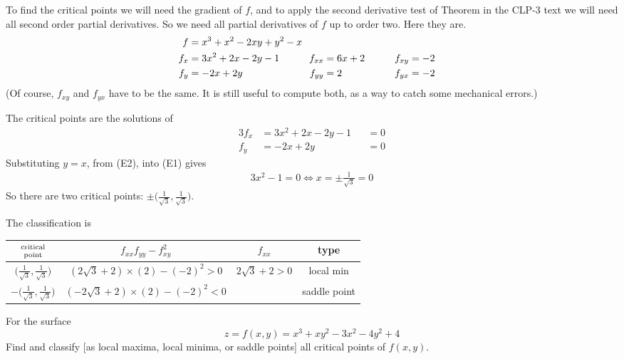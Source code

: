 \begin{solution}
To find the critical points we will need the
gradient of $f$, and to apply the second derivative test of 
Theorem  in the CLP-3 text 
we will need all 
second order partial derivatives. So we need all partial derivatives of
$f$ up to order two.
Here they are.
\begin{alignat*}{3}
f&=x^3 + x^2 - 2xy + y^2 - x \hidewidth\\
f_x&=3x^2+2x-2y-1 \qquad   & f_{xx}&=6x+2 \qquad & f_{xy}&= -2\\
f_y&=-2x+2y  & f_{yy}&=2\qquad & f_{yx}&= -2
\end{alignat*}
(Of course, $f_{xy}$ and $f_{yx}$ have to be the same. It is still
useful to compute both, as a way to catch some mechanical errors.)

The critical points are the solutions of
\begin{alignat*}{3}
f_x&=3x^2+2x-2y-1&&=0  \tag{E1} \\
f_y&=-2x+2y &&= 0  \tag{E2}
\end{alignat*}
Substituting $y=x$, from (E2), into (E1) gives
\begin{align*}
3x^2-1=0
\iff x=\pm\frac{1}{\sqrt{3}}=0
\end{align*}
So there are two critical points: $\pm\big(\frac{1}{\sqrt{3}},\frac{1}{\sqrt{3}}\big)$.


The classification is
\begin{center}
\renewcommand{\arraystretch}{1.3}
     \begin{tabular}{|c|c|c|c|}
     \hline
    $\Atop{\text{critical}}{\text{point}}$  & $f_{xx}f_{yy}-f_{xy}^2$ & 
                                                          $f_{xx}$ & type \\    
    \hline
     $\big(\frac{1}{\sqrt{3}},\frac{1}{\sqrt{3}}\big)$  & 
           $(2\sqrt{3}+2)\times (2)-(-2)^2> 0$ &  $2\sqrt{3}+2>0$  & local min  \\ \hline
     $-\big(\frac{1}{\sqrt{3}},\frac{1}{\sqrt{3}}\big)$  & 
       $(-2\sqrt{3}+2)\times (2)-(-2)^2<0$ &  & saddle point \\  \hline
     \end{tabular}
\renewcommand{\arraystretch}{1.0}
\end{center}
\end{solution}

\begin{question}[M200 2009D] %
For the surface
\begin{equation*}
z = f (x, y) = x^3 + xy^2 - 3x^2 - 4y^2 + 4
\end{equation*}
Find and classify [as local maxima, local minima, or saddle points] all critical points of $f(x,y)$.
\end{question}

